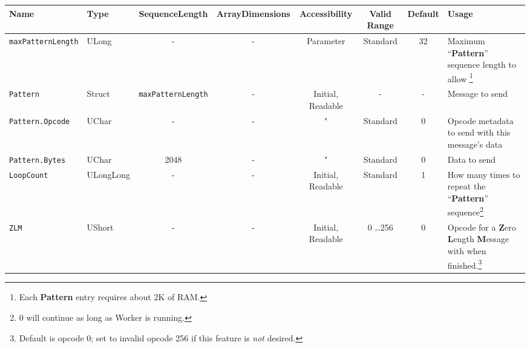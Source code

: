 \documentclass{article}
\begin{document}
\begin{landscape}
\begin{scriptsize}
\begin{minipage}{\textwidth}
			\begin{tabular}{|p{3cm}|p{1.5cm}|c|c|c|c|c|p{7cm}|}
				\hline
				\rowcolor{blue}
				Name                          & Type      & SequenceLength          & ArrayDimensions & Accessibility     & Valid Range  & Default & Usage                                                                                                                                                                             \\
				\hline
				\verb+maxPatternLength+       & ULong     & -                       & -               & Parameter         & Standard     & 32      & Maximum ``\textbf{Pattern}'' sequence length to allow \footnote{Each \textbf{Pattern} entry requires about 2K of RAM.}                                                            \\
				\hline
				\verb+Pattern+                & Struct    & \verb+maxPatternLength+ & -               & Initial, Readable & -            & -       & Message to send                                                                                                                                                                   \\
				\hline
				\verb+Pattern.Opcode+         & UChar     & -                       & -               & "                 & Standard     & 0       & Opcode metadata to send with this message's data                                                                                                                                  \\
				\hline
				\verb+Pattern.Bytes+          & UChar     & 2048                    & -               & "                 & Standard     & 0       & Data to send                                                                                                                                                                      \\
				\hline
				\verb+LoopCount+              & ULongLong & -                       & -               & Initial, Readable & Standard     & 1       & How many times to repeat the ``\textbf{Pattern}'' sequence\footnote{0 will continue as long as Worker is running.}                                                                \\
				\hline
				\verb+ZLM+                    & UShort    & -                       & -               & Initial, Readable & 0 \ldots 256 & 0       & Opcode for a \textbf{Z}ero \textbf{L}ength \textbf{M}essage with when finished.\footnote{Default is opcode 0; set to invalid opcode 256 if this feature is \textit{not} desired.} \\

\end{tabular}
\end{minipage}
\end{scriptsize}
\end{landscape}
\end{document}

